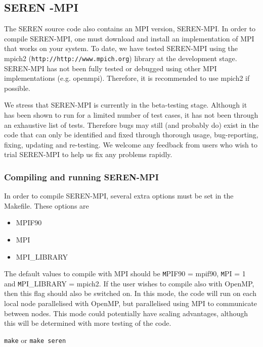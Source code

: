 \documentclass[a4paper]{article}
\newcommand{\NAME}{SEREN }
\newcommand{\var}[1]{\texttt{#1}}
\begin{document}
\newpage

\subsection{\NAME-MPI} \label{SS:MPISEREN}

The \NAME source code also contains an MPI version, SEREN-MPI.  In order to compile SEREN-MPI, one must download and install an implementation of MPI that works on your system.   To date, we have tested SEREN-MPI using the mpich2 (\var{http://http://www.mpich.org}) library at the development stage.  SEREN-MPI has not been fully tested or debugged using other MPI implementations (e.g. openmpi).  Therefore, it is recommended to use mpich2 if possible.  

We stress that SEREN-MPI is currently in the beta-testing stage.  Although it has been shown to run for a limited number of test cases, it has not been through an exhaustive list of tests.  Therefore bugs may still (and probably do) exist in the code that can only be identified and fixed through thorough usage, bug-reporting, fixing, updating and re-testing.  We welcome any feedback from users who wish to trial SEREN-MPI to help us fix any problems rapidly.


\subsubsection{Compiling and running SEREN-MPI}
In order to compile SEREN-MPI, several extra options must be set in the Makefile.  These options are 
\begin{itemize}
\item MPIF90
\item MPI
\item MPI\_LIBRARY
\end{itemize}
The default values to compile with MPI should be {\var MPIF90 = mpif90}, {\var MPI = 1} and {\var MPI\_LIBRARY = mpich2}.  If the user wishes to compile also with OpenMP, then this flag should also be switched on.  In this mode, the code will run on each local node parallelised with OpenMP, but parallelised using MPI to communicate between nodes.  This mode could potentially have scaling advantages, although this will be determined with more testing of the code. \newline

\var{make} or \var{make seren} \newline
\end{document}
